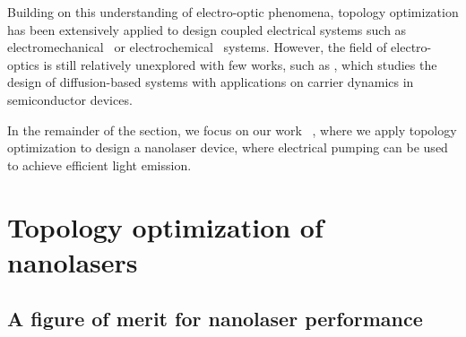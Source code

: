 Building on this understanding of electro-optic phenomena, topology optimization has been extensively applied to design coupled electrical systems such as electromechanical~\cite{MEMS_multi,electrostatic_act} or electrochemical~\cite{electrode} systems. However, the field of electro-optics is
still relatively unexplored with few works, such as \cite{g_heat}, which studies the design of diffusion-based systems with applications on
carrier dynamics in semiconductor devices.

In the remainder of the section, we focus on our work~\cite{ownpub4} , where we apply topology 
optimization to design a nanolaser device, where electrical pumping can be used to achieve efficient light emission.

\section{Topology optimization of nanolasers~\cite{ownpub4}}\label{sec:laser}

\subsection*{A figure of merit for nanolaser performance}

